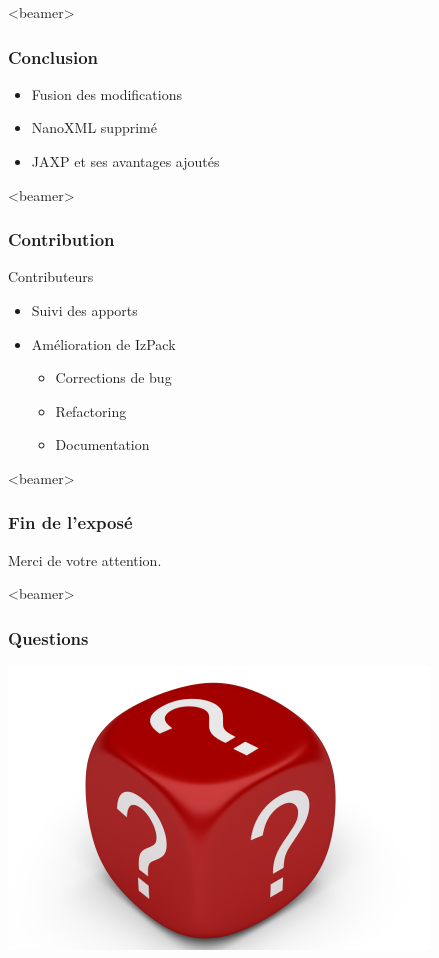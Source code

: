 \begin{frame}<beamer>
\frametitle{Conclusion}
\begin{itemize}
	\item Fusion des modifications
	\item NanoXML supprimé
	\item JAXP et ses avantages ajoutés
\end{itemize}
\end{frame}
\begin{frame}<beamer>
\frametitle{Contribution}
\begin{beamerboxesrounded}[shadow=true]{Contributeurs}
\begin{itemize}
	\item Suivi des apports
	\item Amélioration de IzPack
	\begin{itemize}
		\item Corrections de bug
		\item Refactoring
		\item Documentation
	\end{itemize}
\end{itemize}
\end{beamerboxesrounded}
\end{frame}
\begin{frame}<beamer>\frametitle{Fin de l'exposé}
\begin{center}
\LARGE Merci de votre attention.
\end{center}
\end{frame}
\begin{frame}<beamer>\frametitle{Questions}
\begin{center}
\includegraphics[width=.6\linewidth]{../image/questionMark.jpg}
\end{center}
\end{frame}
